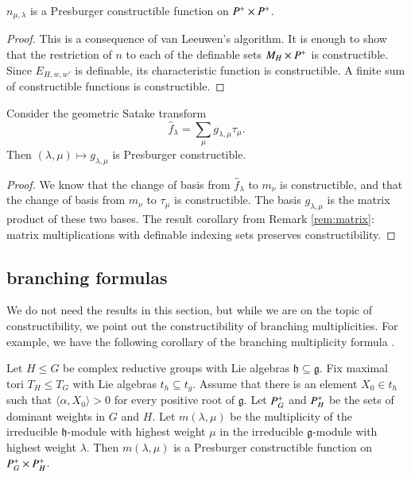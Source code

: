 \begin{theorem}\label{lemma:van-leeuwen} $n_{\mu,\lambda}$ is a Presburger constructible function on $P^+\times P^+$.
\end{theorem}

\begin{proof} This is a consequence of van Leeuwen's algorithm. 
It is enough to show that the restriction of $n$ to each of the definable sets
$M_H\times P^+$ is constructible.  
Since $E_{H,w,w'}$ is definable, its characteristic function is constructible.
A finite sum of constructible functions is constructible.
\end{proof}


\begin{corollary} Consider the geometric Satake transform
\[
\hat f_\lambda = \sum_\mu g_{\lambda,\mu} \tau_\mu.
\]
Then $(\lambda,\mu)\mapsto g_{\lambda,\mu}$ is Presburger constructible.
\end{corollary}

\begin{proof}  We know that the change of basis from $\hat f_\lambda$ to $m_\nu$ is constructible,
and that the change of basis from $m_\nu$ to $\tau_\mu$ is constructible.  The basis $g_{\lambda,\mu}$
is the matrix product of these two bases.  The result corollary from Remark \ref{rem:matrix}:
matrix multiplications with definable indexing sets preserves constructibility.
\end{proof}

\subsection{branching formulas}

We do not need the results in this section, but while we are on the topic of constructibility,
we point out the constructibility of branching multiplicities.
For example, we have the following corollary of the branching
multiplicity formula \cite[Theorem ~8.2.1]{goodman}.

\begin{lemma} Let $H\le G$ be complex reductive groups with Lie algebras ${\mathfrak h}\subseteq {\mathfrak g}$.
Fix maximal tori $T_H\le T_G$ with Lie algebras $t_h\subseteq t_g$.  Assume that there is an element
$X_0\in t_h$ such that $\langle\alpha,X_0\rangle>0$ for every positive root of ${\mathfrak g}$.
Let $P^+_G$ and $P^+_H$ be the sets of dominant weights in $G$ and $H$.  Let $m(\lambda,\mu)$
be the multiplicity of the irreducible $\mathfrak h$-module with highest weight $\mu$ in the irreducible
$\mathfrak g$-module with highest weight $\lambda$.  Then $m(\lambda,\mu)$ is a Presburger constructible
function on $P^+_G\times P^+_H$.
\end{lemma}

